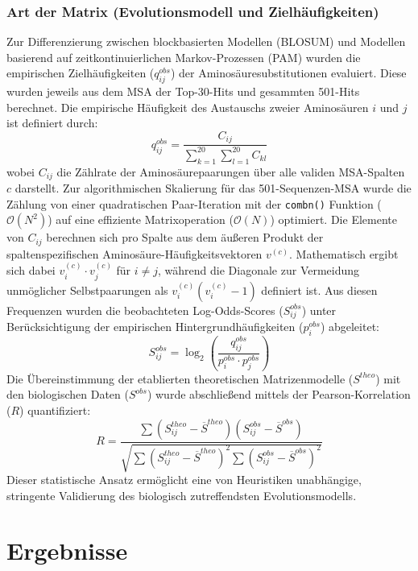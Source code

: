 \documentclass[11pt, a4paper]{article}
\begin{document}
\subsubsection{Art der Matrix (Evolutionsmodell und Zielhäufigkeiten)}
Zur Differenzierung zwischen blockbasierten Modellen (BLOSUM) und Modellen basierend auf zeitkontinuierlichen Markov-Prozessen (PAM) wurden die empirischen Zielhäufigkeiten ($q_{ij}^{obs}$) der Aminosäuresubstitutionen evaluiert. Diese wurden jeweils aus dem MSA der Top-30-Hits und gesammten 501-Hits berechnet. Die empirische Häufigkeit des Austauschs zweier Aminosäuren $i$ und $j$ ist definiert durch:
\begin{equation}
    q_{ij}^{obs} = \frac{C_{ij}}{\sum_{k=1}^{20}\sum_{l=1}^{20} C_{kl}}
\end{equation}
wobei $C_{ij}$ die Zählrate der Aminosäurepaarungen über alle validen MSA-Spalten $c$ darstellt. Zur algorithmischen Skalierung für das 501-Sequenzen-MSA wurde die Zählung von einer quadratischen Paar-Iteration mit der \texttt{combn()} Funktion ($\mathcal{O}(N^2)$) auf eine effiziente Matrixoperation ($\mathcal{O}(N)$) optimiert. Die Elemente von $C_{ij}$ berechnen sich pro Spalte aus dem äußeren Produkt der spaltenspezifischen Aminosäure-Häufigkeitsvektoren $v^{(c)}$. Mathematisch ergibt sich dabei $v_i^{(c)} \cdot v_j^{(c)}$ für $i \neq j$, während die Diagonale zur Vermeidung unmöglicher Selbstpaarungen als $v_i^{(c)}(v_i^{(c)} - 1)$ definiert ist. Aus diesen Frequenzen wurden die beobachteten Log-Odds-Scores ($S_{ij}^{obs}$) unter Berücksichtigung der empirischen Hintergrundhäufigkeiten ($p_i^{obs}$) abgeleitet:
\begin{equation}
    S_{ij}^{obs} = \log_2 \left( \frac{q_{ij}^{obs}}{p_i^{obs} \cdot p_j^{obs}} \right)
\end{equation}
Die Übereinstimmung der etablierten theoretischen Matrizenmodelle ($S^{theo}$) mit den biologischen Daten ($S^{obs}$) wurde abschließend mittels der Pearson-Korrelation ($R$) quantifiziert:
\begin{equation}
    \label{Fomular_Pearson}
    R = \frac{\sum (S_{ij}^{theo} - \overline{S}^{theo})(S_{ij}^{obs} - \overline{S}^{obs})}{\sqrt{\sum (S_{ij}^{theo} - \overline{S}^{theo})^2 \sum (S_{ij}^{obs} - \overline{S}^{obs})^2}}
\end{equation}
Dieser statistische Ansatz ermöglicht eine von Heuristiken unabhängige, stringente Validierung des biologisch zutreffendsten Evolutionsmodells.

\section{Ergebnisse}
\end{document}
